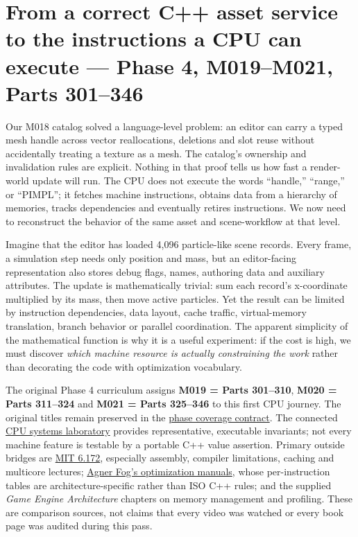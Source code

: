 \section{From a correct C++ asset service to the instructions a CPU can execute --- Phase 4, M019--M021, Parts 301--346}\label{05-engine-i-ch007-from-a-correct-c-asset-service-to-the-instructions-a-cpu-can-execute-phase-4-m019m021-parts-301346}

Our M018 catalog solved a language-level problem: an editor can carry a typed mesh handle across vector reallocations, deletions and slot reuse without accidentally treating a texture as a mesh. The catalog's ownership and invalidation rules are explicit. Nothing in that proof tells us how fast a render-world update will run. The CPU does not execute the words ``handle,'' ``range,'' or ``PIMPL''; it fetches machine instructions, obtains data from a hierarchy of memories, tracks dependencies and eventually retires instructions. We now need to reconstruct the behavior of the same asset and scene-workflow at that level.

Imagine that the editor has loaded 4,096 particle-like scene records. Every frame, a simulation step needs only position and mass, but an editor-facing representation also stores debug flags, names, authoring data and auxiliary attributes. The update is mathematically trivial: sum each record's x-coordinate multiplied by its mass, then move active particles. Yet the result can be limited by instruction dependencies, data layout, cache traffic, virtual-memory translation, branch behavior or parallel coordination. The apparent simplicity of the mathematical function is why it is a useful experiment: if the cost is high, we must discover \emph{which machine resource is actually constraining the work} rather than decorating the code with optimization vocabulary.

The original Phase 4 curriculum assigns \textbf{M019 = Parts 301--310}, \textbf{M020 = Parts 311--324} and \textbf{M021 = Parts 325--346} to this first CPU journey. The original titles remain preserved in the \hyperref[appendix-fd090d982a15-phase-4-cpu-architecture-and-measured-execution-parts-301400]{phase coverage contract}. The connected \hyperref[source-file-0060a91bd24dd25d6c14e679]{CPU systems laboratory} provides representative, executable invariants; not every machine feature is testable by a portable C++ value assertion. Primary outside bridges are \href{https://ocw.mit.edu/courses/6-172-performance-engineering-of-software-systems-fall-2018/video_galleries/lecture-videos/}{MIT 6.172}, especially assembly, compiler limitations, caching and multicore lectures; \href{https://www.agner.org/optimize/}{Agner Fog's optimization manuals}, whose per-instruction tables are architecture-specific rather than ISO C++ rules; and the supplied \emph{Game Engine Architecture} chapters on memory management and profiling. These are comparison sources, not claims that every video was watched or every book page was audited during this pass.

